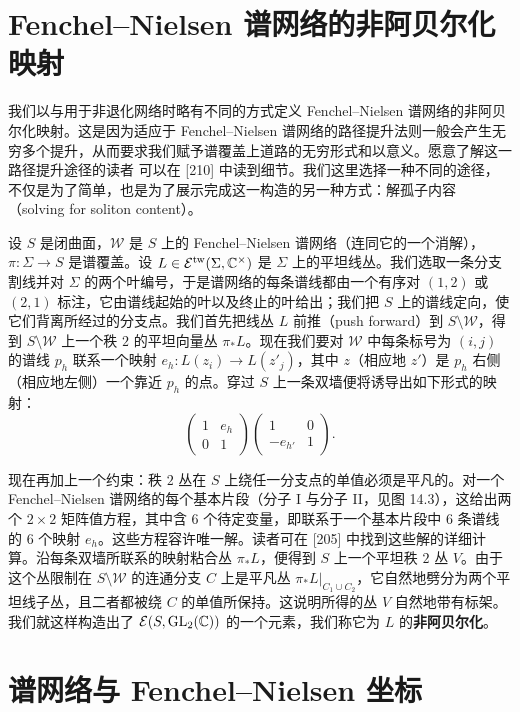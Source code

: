 \section{Fenchel–Nielsen 谱网络的非阿贝尔化映射}

我们以与用于非退化网络时略有不同的方式定义 Fenchel–Nielsen 谱网络的非阿贝尔化映射。这是因为适应于 Fenchel–Nielsen 谱网络的路径提升法则一般会产生无穷多个提升，从而要求我们赋予谱覆盖上道路的无穷形式和以意义。愿意了解这一路径提升途径的读者%
可以在 [210] 中读到细节。我们这里选择一种不同的途径，不仅是为了简单，也是为了展示完成这一构造的另一种方式：解孤子内容（solving for soliton content）。

设 $S$ 是闭曲面，$\mathcal{W}$ 是 $S$ 上的 Fenchel–Nielsen 谱网络（连同它的一个消解），$\pi\colon\Sigma\to S$ 是谱覆盖。设 $L\in\mathcal{E}^{\mathrm{tw}}(\Sigma,\mathbb{C}^\times)$ 是 $\Sigma$ 上的平坦线丛。我们选取一条分支割线并对 $\Sigma$ 的两个叶编号，于是谱网络的每条谱线都由一个有序对 $(1,2)$ 或 $(2,1)$ 标注，它由谱线起始的叶以及终止的叶给出；我们把 $S$ 上的谱线定向，使它们背离所经过的分支点。我们首先把线丛 $L$ 前推（push forward）到 $S\setminus\mathcal{W}$，得到 $S\setminus\mathcal{W}$ 上一个秩 $2$ 的平坦向量丛 $\pi_\ast L$。现在我们要对 $\mathcal{W}$ 中每条标号为 $(i,j)$ 的谱线 $p_h$ 联系一个映射 $e_h\colon L(z_i)\to L(z'_j)$，其中 $z$（相应地 $z'$）是 $p_h$ 右侧（相应地左侧）一个靠近 $p_h$ 的点。穿过 $S$ 上一条双墙便将诱导出如下形式的映射：
\[
\begin{pmatrix}1 & e_h\\ 0 & 1\end{pmatrix}
\begin{pmatrix}1 & 0\\ -e_{h'} & 1\end{pmatrix} .
\]

现在再加上一个约束：秩 $2$ 丛在 $S$ 上绕任一分支点的单值必须是平凡的。对一个 Fenchel–Nielsen 谱网络的每个基本片段（分子 I 与分子 II，见图 14.3），这给出两个 $2\times2$ 矩阵值方程，其中含 $6$ 个待定变量，即联系于一个基本片段中 $6$ 条谱线的 $6$ 个映射 $e_h$。这些方程容许唯一解。读者可在 [205] 中找到这些解的详细计算。沿每条双墙所联系的映射粘合丛 $\pi_\ast L$，便得到 $S$ 上一个平坦秩 $2$ 丛 $V$。由于这个丛限制在 $S\setminus\mathcal{W}$ 的连通分支 $C$ 上是平凡丛 $\pi_\ast L|_{C_1\cup C_2}$，它自然地劈分为两个平坦线子丛，且二者都被绕 $C$ 的单值所保持。这说明所得的丛 $V$ 自然地带有标架。我们就这样构造出了 $\mathcal{E}(S,\operatorname{GL}_2(\mathbb{C}))$ 的一个元素，我们称它为 $L$ 的\textbf{非阿贝尔化}。

\section{谱网络与 Fenchel–Nielsen 坐标}

